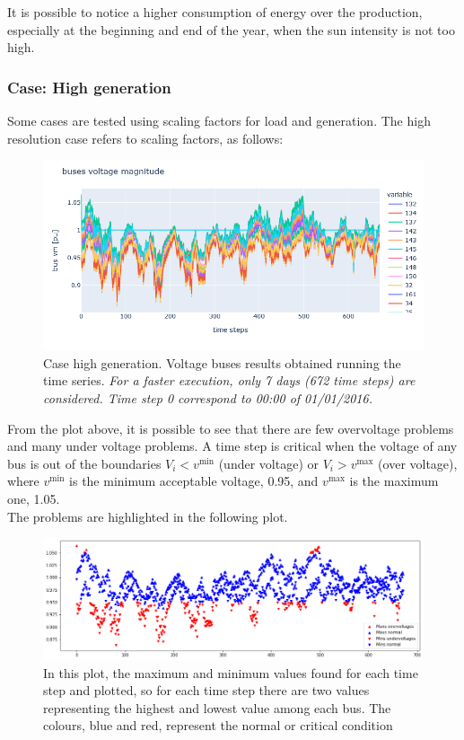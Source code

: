 It is possible to notice a higher consumption of energy over the production, especially at the beginning and end of the year, when the sun intensity is not too high. \\

\subsubsection{Case: High generation}
Some cases are tested using scaling factors for load and generation. The high resolution case refers to scaling factors, as follows:
\begin{algorithm}[h]
    
\end{algorithm}

\begin{figure}[H]
\centering
    \includegraphics[width=.7\linewidth]{images/MVOberr/High gen.png}
\caption{Case high generation. Voltage buses results obtained running the time series. \emph{For a faster execution, only 7 days (672 time steps) are considered. Time step 0 correspond to 00:00 of 01/01/2016.}}
\label{fig:gym_anm_net}
\end{figure}

From the plot above, it is possible to see that there are few overvoltage problems and many under voltage problems. A time step is critical when the voltage of any bus is out of the boundaries $V_i < v^{\text{min}}$ (under voltage) or $V_i > v^{\text{max}}$ (over voltage), where $v^{\text{min}}$ is the minimum acceptable voltage, 0.95, and $v^{\text{max}}$ is the maximum one, 1.05. \\
The problems are highlighted in the following plot.

\begin{figure}[H]
\centering
    \includegraphics[width=.8\linewidth]{images/MVOberr/High gen problems.png}
\caption{In this plot, the maximum and minimum values found for each time step and plotted, so for each time step there are two values representing the highest and lowest value among each bus. The colours, blue and red, represent the normal or critical condition}

 \end{figure}






